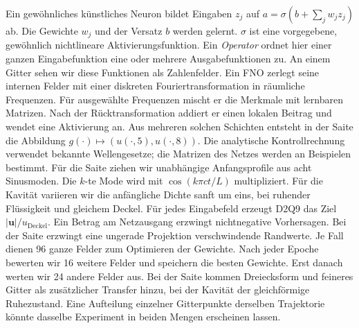 Ein gewöhnliches künstliches Neuron bildet Eingaben \(z_j\) auf \(a=\sigma(b+\sum_j w_j z_j)\) ab. Die Gewichte \(w_j\) und der Versatz \(b\) werden gelernt. \(\sigma\) ist eine vorgegebene, gewöhnlich nichtlineare Aktivierungsfunktion. Ein \emph{Operator} ordnet hier einer ganzen Eingabefunktion eine oder mehrere Ausgabefunktionen zu. An einem Gitter sehen wir diese Funktionen als Zahlenfelder.
Ein FNO zerlegt seine internen Felder mit einer diskreten Fouriertransformation in räumliche Frequenzen. Für ausgewählte Frequenzen mischt er die Merkmale mit lernbaren Matrizen. Nach der Rücktransformation addiert er einen lokalen Beitrag und wendet eine Aktivierung an. Aus mehreren solchen Schichten entsteht in der Saite die Abbildung \(g(\cdot)\mapsto (u(\cdot,5),u(\cdot,8))\). Die analytische Kontrollrechnung verwendet bekannte Wellengesetze; die Matrizen des Netzes werden an Beispielen bestimmt.
Für die Saite ziehen wir unabhängige Anfangsprofile aus acht Sinusmoden. Die \(k\)-te Mode wird mit \(\cos(k\pi ct/L)\) multipliziert. Für die Kavität variieren wir die anfängliche Dichte sanft um eins, bei ruhender Flüssigkeit und gleichem Deckel. Für jedes Eingabefeld erzeugt D2Q9 das Ziel \(|\mathbf u|/u_\mathrm{Deckel}\). Ein Betrag am Netzausgang erzwingt nichtnegative Vorhersagen. Bei der Saite erzwingt eine ungerade Projektion verschwindende Randwerte.
Je Fall dienen 96 ganze Felder zum Optimieren der Gewichte. Nach jeder Epoche bewerten wir 16 weitere Felder und speichern die besten Gewichte. Erst danach werten wir 24 andere Felder aus. Bei der Saite kommen Dreiecksform und feineres Gitter als zusätzlicher Transfer hinzu, bei der Kavität der gleichförmige Ruhezustand. Eine Aufteilung einzelner Gitterpunkte derselben Trajektorie könnte dasselbe Experiment in beiden Mengen erscheinen lassen.

